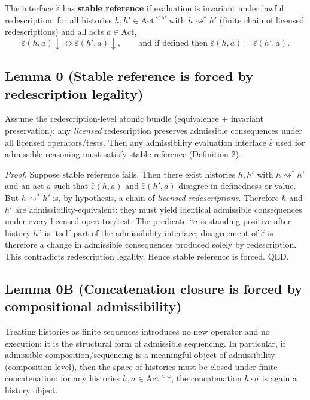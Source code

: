 \documentclass[12pt]{article}
\theoremstyle{plain}
\begin{document}
The interface $\widehat\varepsilon$ has \textbf{stable reference} if evaluation is invariant under lawful redescription: for all histories $h,h'\in \mathrm{Act}^{<\omega}$ with $h\rightsquigarrow^* h'$ (finite chain of licensed redescriptions) and all acts $a\in\mathrm{Act}$,
\[
\widehat\varepsilon(h,a)\downarrow \Longleftrightarrow \widehat\varepsilon(h',a)\downarrow,
\qquad
\text{and if defined then }\widehat\varepsilon(h,a)=\widehat\varepsilon(h',a).
\]


\subsection{Lemma 0 (Stable reference is forced by redescription legality)}

Assume the redescription-level atomic bundle (equivalence + invariant preservation): any \emph{licensed} redescription preserves admissible consequences under all licensed operators/tests. Then any admissibility evaluation interface $\widehat\varepsilon$ used for admissible reasoning must satisfy stable reference (Definition 2).

\textit{Proof.} Suppose stable reference fails. Then there exist histories $h,h'$ with $h\rightsquigarrow^* h'$ and an act $a$ such that $\widehat\varepsilon(h,a)$ and $\widehat\varepsilon(h',a)$ disagree in definedness or value. But $h\rightsquigarrow^* h'$ is, by hypothesis, a chain of \emph{licensed redescriptions}. Therefore $h$ and $h'$ are admissibility-equivalent: they must yield identical admissible consequences under every licensed operator/test. The predicate ``$a$ is standing-positive after history $h$'' is itself part of the admissibility interface; disagreement of $\widehat\varepsilon$ is therefore a change in admissible consequences produced solely by redescription. This contradicts redescription legality. Hence stable reference is forced. QED.

\subsection{Lemma 0B (Concatenation closure is forced by compositional admissibility)}

Treating histories as finite sequences introduces no new operator and no execution: it is the structural form of admissible sequencing. In particular, if admissible composition/sequencing is a meaningful object of admissibility (composition level), then the space of histories must be closed under finite concatenation: for any histories $h,\sigma\in \mathrm{Act}^{<\omega}$, the concatenation $h\cdot\sigma$ is again a history object.
\end{document}
